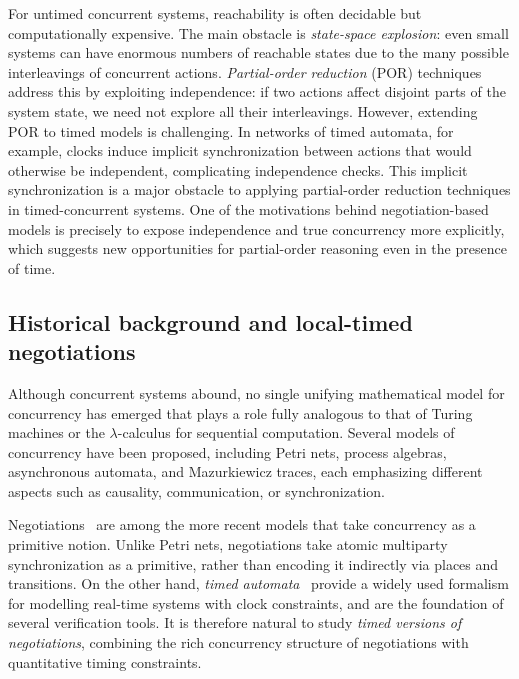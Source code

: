 For untimed concurrent systems, reachability is often decidable but computationally expensive. The main obstacle is \emph{state-space explosion}: even small systems can have enormous numbers of reachable states due to the many possible interleavings of concurrent actions. \emph{Partial-order reduction} (POR) techniques address this by exploiting independence: if two actions affect disjoint parts of the system state, we need not explore all their interleavings. However, extending POR to timed models is challenging. In networks of timed automata, for example, clocks induce implicit synchronization between actions that would otherwise be independent, complicating independence checks. This implicit synchronization is a major obstacle to applying partial-order reduction techniques in timed-concurrent systems. One of the motivations behind negotiation-based models is precisely to expose independence and true concurrency more explicitly, which suggests new opportunities for partial-order reasoning even in the presence of time.

\subsection{Historical background and local-timed negotiations}

Although concurrent systems abound, no single unifying mathematical model for concurrency has emerged that plays a role fully analogous to that of Turing machines or the $\lambda$-calculus for sequential computation. Several models of concurrency have been proposed, including Petri nets, process algebras, asynchronous automata, and Mazurkiewicz traces, each emphasizing different aspects such as causality, communication, or synchronization.

Negotiations~\cite{EsparzaDeselNegotiations} are among the more recent models that take concurrency as a primitive notion. Unlike Petri nets, negotiations take atomic multiparty synchronization as a primitive, rather than encoding it indirectly via places and transitions. On the other hand, \textit{timed automata}~\cite{AlurDillTA} provide a widely used formalism for modelling real-time systems with clock constraints, and are the foundation of several verification tools. It is therefore natural to study \textit{timed versions of negotiations}, combining the rich concurrency structure of negotiations with quantitative timing constraints.


